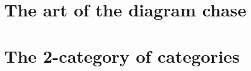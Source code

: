 \documentclass[../main]{subfiles}
\begin{document}
\pagebreak
\section{The art of the diagram chase}







\pagebreak
\section{The 2-category of categories}







\end{document}
